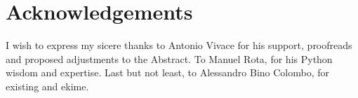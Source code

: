 
\section*{Acknowledgements}\label{section:acknowledgements}

I wish to express my sicere thanks to Antonio Vivace for his support, proofreads and proposed adjustments to the Abstract.
To Manuel Rota, for his Python wisdom and expertise.
Last but not least, to Alessandro Bino Colombo, for existing and ekime.
